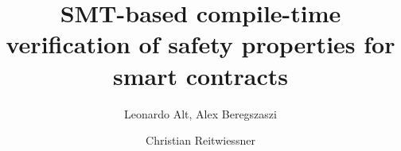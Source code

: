 \documentclass{llncs}
\begin{document}
\pagestyle{plain}

\title{SMT-based compile-time verification of safety properties for smart contracts}

\author{Leonardo Alt, Alex Beregszaszi \and Christian Reitwiessner}
\maketitle










\end{document}
